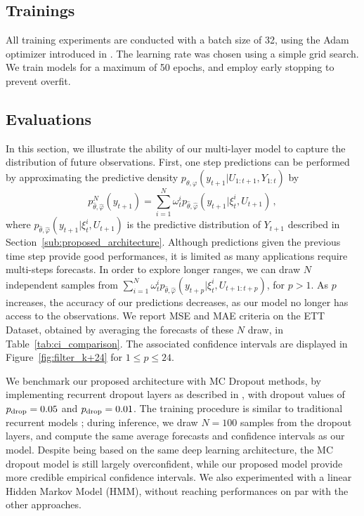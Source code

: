 \documentclass[journal]{IEEEtran}
\begin{document}
\subsection{Trainings}
\label{sub:trainings}
All training experiments are conducted with a batch size of 32, using the Adam optimizer introduced in \cite{Kingma2015AdamAM}.
The learning rate was chosen using a simple grid search.
We train models for a maximum of 50 epochs, and employ early stopping to prevent overfit.

\subsection{Evaluations}%
\label{sub:evaluations}

In this section, we illustrate the ability of our multi-layer model to capture the distribution of future observations.
First, one step predictions can be performed by approximating the predictive density $p_{\theta,\varphi}(y_{t+1}|U_{1:t+1},Y_{1:t})$ by
$$
	p^N_{\widehat\theta,\widehat\varphi}(y_{t+1})= \sum_{i=1}^{N}\omega_t^i p_{\widehat\theta,\widehat\varphi}(y_{t+1}|\xi_t^i,U_{t+1})\,,
$$
where $ p_{\widehat\theta,\widehat\varphi}(y_{t+1}|\xi_t^i,U_{t+1})$ is the predictive distribution of $Y_{t+1}$ described in Section~\ref{sub:proposed_architecture}.
Although predictions given the previous time step provide good performances, it is limited as many applications require multi-steps forecasts.
In order to explore longer ranges, we can draw $N$ independent samples from $\sum_{i=1}^{N}\omega_t^i p_{\widehat\theta,\widehat\varphi}(y_{t+p}|\xi_t^i,U_{t+1:t+p})$, for $p>1$.
As $p$ increases, the accuracy of our predictions decreases, as our model no longer has access to the observations.
We report MSE and MAE criteria on the ETT Dataset, obtained by averaging the forecasts of these $N$ draw, in Table~\ref{tab:ci_comparison}.
The associated confidence intervals are displayed in Figure~\ref{fig:filter_k+24} for $1\leq p \leq 24$.

We benchmark our proposed architecture with MC Dropout methods, by implementing recurrent dropout layers as described in \cite{Gal2016NIPS}, with dropout values of $p_\textnormal{drop}=0.05$ and $p_\textnormal{drop}=0.01$.
The training procedure is similar to traditional recurrent models ; during inference, we draw $N=100$ samples from the dropout layers, and compute the same average forecasts and confidence intervals as our model.
Despite being based on the same deep learning architecture, the MC dropout model is still largely overconfident, while our proposed model provide more credible empirical confidence intervals.
We also experimented with a linear Hidden Markov Model (HMM), without reaching performances on par with the other approaches.
\end{document}
